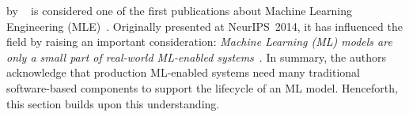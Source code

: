 % 
% 
% 
% 

\emph{}
by \citeauthor{Sculley2015HiddenSystems}~\parencite{Sculley2015HiddenSystems}
is considered one of the first publications about Machine Learning Engineering
(MLE)~\parencite{Serban2020AdoptionLearning}. Originally presented at
\mbox{NeurIPS 2014}, it has influenced the field by raising an important
consideration: \emph{Machine Learning (ML) models are only a small part
of real-world ML-enabled systems}~\parencite{Sculley2015HiddenSystems}.
In summary, the authors acknowledge that production ML-enabled systems
need many traditional software-based components to support the lifecycle
of an ML model. Henceforth, this section builds upon this understanding.

